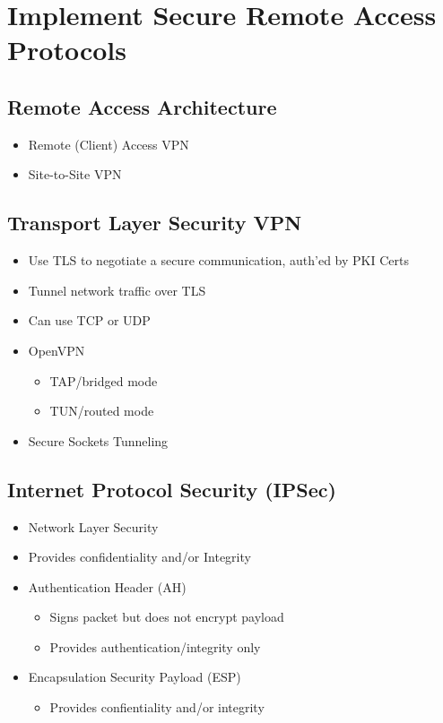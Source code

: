 \section {Implement Secure Remote Access Protocols}
	\subsection {Remote Access Architecture}
		\begin{itemize}
			\item Remote (Client) Access VPN
			\item Site-to-Site VPN
		\end{itemize}
	\subsection {Transport Layer Security VPN}
		\begin{itemize}
			\item Use TLS to negotiate a secure communication, auth'ed by PKI Certs
			\item Tunnel network traffic over TLS
			\item Can use TCP or UDP
			\item OpenVPN
				\begin{itemize}
					\item TAP/bridged mode
					\item TUN/routed mode
				\end{itemize}
			\item Secure Sockets Tunneling
		\end{itemize}
	\subsection {Internet Protocol Security (IPSec)}
		\begin{itemize}
			\item Network Layer Security
			\item Provides confidentiality and/or Integrity
			\item Authentication Header (AH)
				\begin{itemize}
					\item Signs packet but does not encrypt payload
					\item Provides authentication/integrity only
				\end{itemize}
			\item Encapsulation Security Payload (ESP)
				\begin{itemize}
					\item Provides confientiality and/or integrity
				\end{itemize}
		\end{itemize}
